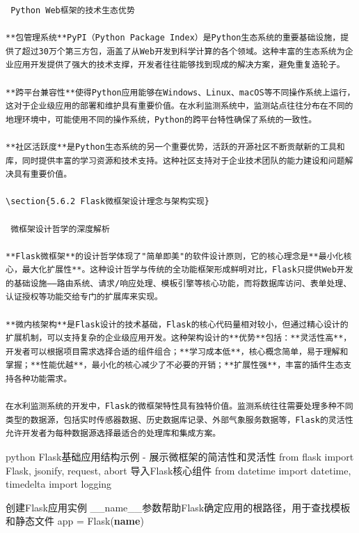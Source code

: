 \begin{lstlisting}
 Python Web框架的技术生态优势

**包管理系统**PyPI（Python Package Index）是Python生态系统的重要基础设施，提供了超过30万个第三方包，涵盖了从Web开发到科学计算的各个领域。这种丰富的生态系统为企业应用开发提供了强大的技术支撑，开发者往往能够找到现成的解决方案，避免重复造轮子。

**跨平台兼容性**使得Python应用能够在Windows、Linux、macOS等不同操作系统上运行，这对于企业级应用的部署和维护具有重要价值。在水利监测系统中，监测站点往往分布在不同的地理环境中，可能使用不同的操作系统，Python的跨平台特性确保了系统的一致性。

**社区活跃度**是Python生态系统的另一个重要优势，活跃的开源社区不断贡献新的工具和库，同时提供丰富的学习资源和技术支持。这种社区支持对于企业技术团队的能力建设和问题解决具有重要价值。

\section{5.6.2 Flask微框架设计理念与架构实现}

 微框架设计哲学的深度解析

**Flask微框架**的设计哲学体现了"简单即美"的软件设计原则，它的核心理念是**最小化核心，最大化扩展性**。这种设计哲学与传统的全功能框架形成鲜明对比，Flask只提供Web开发的基础设施——路由系统、请求/响应处理、模板引擎等核心功能，而将数据库访问、表单处理、认证授权等功能交给专门的扩展库来实现。

**微内核架构**是Flask设计的技术基础，Flask的核心代码量相对较小，但通过精心设计的扩展机制，可以支持复杂的企业级应用开发。这种架构设计的**优势**包括：**灵活性高**，开发者可以根据项目需求选择合适的组件组合；**学习成本低**，核心概念简单，易于理解和掌握；**性能优越**，最小化的核心减少了不必要的开销；**扩展性强**，丰富的插件生态支持各种功能需求。

在水利监测系统的开发中，Flask的微框架特性具有独特价值。监测系统往往需要处理多种不同类型的数据源，包括实时传感器数据、历史数据库记录、外部气象服务数据等，Flask的灵活性允许开发者为每种数据源选择最适合的处理库和集成方案。
\end{lstlisting}

python  Flask基础应用结构示例 - 展示微框架的简洁性和灵活性 from flask import Flask, jsonify, request, abort  导入Flask核心组件 from datetime import datetime, timedelta import logging

 创建Flask应用实例  \_\_name\_\_参数帮助Flask确定应用的根路径，用于查找模板和静态文件 app = Flask(\textbf{name})


